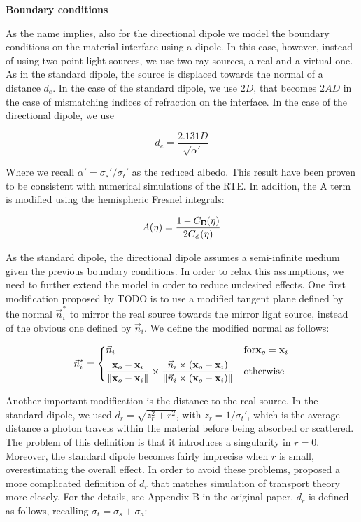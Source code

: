 \textbf{Boundary conditions}

As the name implies, also for the directional dipole we model the boundary conditions on the material interface using a dipole. In this case, however, instead of using two point light sources, we use two ray sources, a real and a virtual one. As in the standard dipole, the source is displaced towards the normal of a distance $d_e$. In the case of the standard dipole, we use $2D$, that becomes $2 A D$ in the case of mismatching indices of refraction on the interface. In the case of the directional dipole, we use 

$$
d_e = \frac{2.131 D}{\sqrt{\alpha'}}
$$ 

Where we recall $\alpha' = \sigma_s' / \sigma_t'$ as the reduced albedo. This result have been proven \citep{ntt} to be consistent with numerical simulations of the RTE. In addition, the A term is modified using the hemispheric Fresnel integrals:

$$
A(\eta) = \frac{1 - C_{\mathbf{E}}(\eta)}{2 C_{\phi}(\eta)}
$$

As the standard dipole, the directional dipole assumes a semi-infinite medium given the previous boundary conditions. In order to relax this assumptions, we need to further extend the model in order to reduce undesired effects. One first modification proposed by TODO is to use a modified tangent plane defined by the normal $\vec{n}_i^*$ to mirror the real source towards the mirror light source, instead of the obvious one defined by $\vec{n}_i$. We define the modified normal as follows:

$$
\vec{n}_i^* = 
\begin{dcases} 
\vec{n}_i & \text{for} \mathbf{x}_o = \mathbf{x}_i \\
\frac{\mathbf{x}_o - \mathbf{x}_i}{\|\mathbf{x}_o - \mathbf{x}_i\|} \times \frac{\vec{n}_i \times (\mathbf{x}_o - \mathbf{x}_i)}{\|\vec{n}_i \times (\mathbf{x}_o - \mathbf{x}_i)\|} & \text{otherwise}
\end{dcases}
$$

Another important modification is the distance to the real source. In the standard dipole, we used $d_r = \sqrt{z_r^2 + r^2}$, with $z_r = 1 / \sigma_t'$, which is the average distance a photon travels within the material before being absorbed or scattered. The problem of this definition is that it introduces a singularity in $r = 0$. Moreover, the standard dipole becomes fairly imprecise when $r$ is small, overestimating the overall effect. In order to avoid these problems, \cite{IMM2013-06646} proposed a more complicated definition of $d_r$ that matches simulation of transport theory more closely. For the details, see Appendix B in the original paper. $d_r$ is defined as follows, recalling $\sigma_t = \sigma_s + \sigma_a$:

